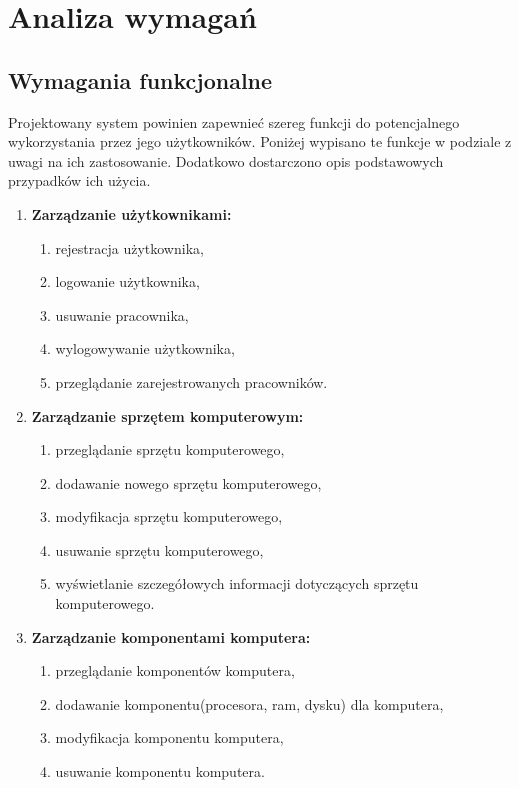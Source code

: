 \chapter{Analiza wymagań}

\section{Wymagania funkcjonalne}

Projektowany system powinien zapewnieć szereg funkcji do potencjalnego wykorzystania przez jego użytkowników. Poniżej wypisano te funkcje w podziale z uwagi na ich zastosowanie. Dodatkowo dostarczono opis podstawowych przypadków ich użycia.
\begin{enumerate}[label={\textbf{FR}-\bfseries\arabic*}]
    \item \textbf{Zarządzanie użytkownikami:}
    \begin{enumerate}[label={FR-\arabic{enumi}.\arabic*},noparskip]
        \item rejestracja użytkownika,
        \item logowanie użytkownika,
        \item usuwanie pracownika,
        \item wylogowywanie użytkownika,
				\item przeglądanie zarejestrowanych pracowników.
    \end{enumerate}
		
		\item \textbf{Zarządzanie sprzętem komputerowym:}
    \begin{enumerate}[label={FR-\arabic{enumi}.\arabic*},noparskip]
        \item przeglądanie sprzętu komputerowego,
        \item dodawanie nowego sprzętu komputerowego,
        \item modyfikacja sprzętu komputerowego,
        \item usuwanie sprzętu komputerowego,
				\item wyświetlanie szczegółowych informacji dotyczących sprzętu komputerowego.
		\end{enumerate}
		
		\item \textbf{Zarządzanie komponentami komputera:}
			\begin{enumerate}[label={FR-\arabic{enumi}.\arabic*},noparskip]		
				\item przeglądanie komponentów komputera,
				\item dodawanie komponentu(procesora, ram, dysku) dla komputera,
				\item modyfikacja komponentu komputera,
				\item usuwanie komponentu komputera.
    \end{enumerate}
		

\end{enumerate}
